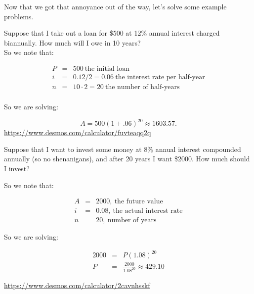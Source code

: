 Now that we got that annoyance out of the way, let's solve some example problems.

\begin{example}
Suppose that I take out a loan for \$500 at 12\% annual interest charged biannually.  How much will I owe in 10 years?\\

So we note that:

\begin{eqnarray*}
P&=&500\ \text{the initial loan}\\
i&=&0.12/2=0.06 \ \text{the interest rate per half-year}\\
n&=&10\cdot 2=20 \ \text{the number of half-years}\\
\end{eqnarray*}

So we are solving:

$$A=500(1+.06)^{20}\approx 1603.57.$$ \url{https://www.desmos.com/calculator/fuvteaqq2q}

\end{example}


\begin{example}
Suppose that I want to invest some money at 8\% annual interest compounded annually (so no shenanigans), and after 20 years I want \$2000.  How much should I invest?

So we note that:

\begin{eqnarray*}
A&=&2000, \ \text{the future value}\\
i&=&0.08, \ \text{the actual interest rate}\\
n&=&20, \ \text{number of years}
\end{eqnarray*}

So we are solving:

\begin{eqnarray*}
2000&=&P(1.08)^{20}\\
P&=&\frac{2000}{1.08^{20}}\approx429.10
\end{eqnarray*}

\url{https://www.desmos.com/calculator/2cavnhsskf}

\end{example}


